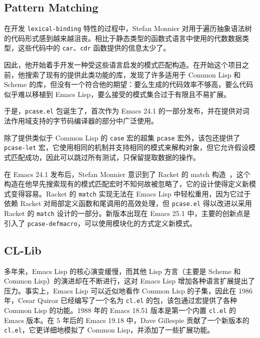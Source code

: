 \documentclass[format=acmsmall,screen]{acmart}
\begin{document}
\subsection{Pattern Matching}           %
\label{sec:pcase}

在开发 \texttt{lexical-binding} 特性的过程中，Stefan Monnier 对用于遍历抽象语法树的代码形式感到越来越沮丧。相比于静态类型的函数式语言中使用的代数数据类型，这些代码中的 \texttt{car}、\texttt{cdr} 函数提供的信息太少了。

因此，他开始着手开发一种受这些语言启发的模式匹配构造。在开始这个项目之前，他搜索了现有的提供此类功能的库，发现了许多适用于 Common Lisp 和 Scheme 的库，但没有一个符合他的期望：要么生成的代码效率不够高，要么代码似乎难以移植到 Emacs Lisp，要么接受的模式集合过于有限且不易扩展。

于是，\texttt{pcase.el} 包诞生了，首次作为 Emacs 24.1 的一部分发布，并在提供对词法作用域支持的字节码编译器的部分中广泛使用。

除了提供类似于 Common Lisp 的 \texttt{case} 宏的超集 \texttt{pcase} 宏外，该包还提供了 \texttt{pcase-let} 宏，它使用相同的机制并支持相同的模式来解构对象，但它允许假设模式匹配成功，因此可以跳过所有测试，只保留提取数据的操作。

在 Emacs 24.1 发布后，Stefan Monnier 意识到了 Racket 的 match 构造~\cite{RacketReference2018}，这个构造在他早先搜索现有的模式匹配宏时不知何故被忽略了，它的设计使得定义新模式变得容易。Racket 的 \texttt{match} 实现无法在 Emacs Lisp 中轻松重用，因为它过于依赖 Racket 对局部定义函数和尾调用的高效处理，但 \texttt{pcase.el} 得以改进以采用 Racket 的 \texttt{match} 设计的一部分。新版本出现在 Emacs 25.1 中，主要的创新点是引入了 \texttt{pcase-defmacro}，可以使用模块化的方式定义新模式。

\subsection{CL-Lib}          %
\label{sec:cl-lib}

多年来，Emacs Lisp 的核心演变缓慢，而其他 Lisp 方言（主要是 Scheme 和 Common Lisp）的演进却在不断进行，这对 Emacs Lisp 增加各种语言扩展提出了压力。事实上，Emacs Lisp 可以近似地看作 Common Lisp 的子集，因此在 1986 年，Cesar Quiroz 已经编写了一个名为 \texttt{cl.el} 的包，该包通过宏提供了各种 Common Lisp 的功能。1988 年的 Emacs 18.51 版本是第一个内置 \texttt{cl.el} 的 Emacs 版本。在 5 年后的 Emacs 19.18 中，Dave Gillespie 贡献了一个新版本的 \texttt{cl.el}，它更详细地模拟了 Common Lisp，并添加了一些扩展功能。
\end{document}

